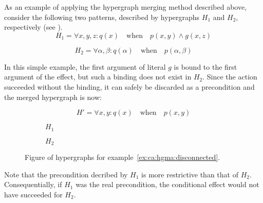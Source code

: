 \documentclass[../Master.tex]{subfiles}
\providecommand{\master}{..}
\begin{document}
\begin{example} \label{ex:ca:hgma:disconnected}
	As an example of applying the hypergraph merging method described above, consider the following two patterns, described by hypergraphs $H_1$ and $H_2$, respectively (see ).
    \begin{equation*}
        H_1 = \forall x, y, z : q(x) \quad \text{when} \quad
            p(x,y) \land g(x, z)
    \end{equation*}

    \begin{equation*}
        H_2 = \forall \alpha, \beta : q(\alpha) \quad \text{when} \quad
            p(\alpha, \beta)
    \end{equation*}

	In this simple example, the first argument of literal $g$ is bound to the first argument of the effect, but such a binding does not exist in $H_2$. Since the action succeeded without the binding, it can safely be discarded as a precondition and the merged hypergraph is now:

    \begin{equation*}
        H' = \forall x, y : q(x) \quad \text{when} \quad p(x, y)
    \end{equation*}

    \begin{figure}
        \centering
        \begin{subfigure}{0.4\textwidth}
            \centering
            \raisebox{-0.5\height}{\resizebox{\linewidth}{!}{}}
			\caption{$H_1$}
            \label{fig:ex:ca:hgma:ex:disconnected1}
        \end{subfigure}%
        \hfill%
        \begin{subfigure}{0.4\textwidth}
            \centering
            \resizebox{0.65\linewidth}{!}{\raisebox{-0.5\height}{}}
            \caption{$H_2$}
            \label{fig:ex:ca:hgma:ex:disconnected2}
        \end{subfigure}
        \caption{Figure of hypergraphs for example~\ref{ex:ca:hgma:disconnected}.}\label{fig:ex:ca:hgma:ex:disconnected}
    \end{figure}

    Note that the precondition decribed by $H_1$ is more restrictive than that of $H_2$. Consequentially, if $H_1$ was the real precondition, the conditional effect would not have succeeded for $H_2$.
\end{example}
\end{document}
